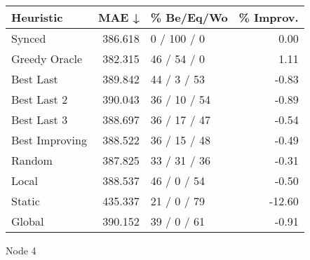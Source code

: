 \begin{tabular}{lrlr}
\toprule
\textbf{Heuristic} & \textbf{MAE ↓} & \textbf{\% Be/Eq/Wo} & \textbf{\% Improv.} \\
\midrule
            Synced &        386.618 &          0 / 100 / 0 &                0.00 \\
     Greedy Oracle &        382.315 &          46 / 54 / 0 &                1.11 \\
         Best Last &        389.842 &          44 / 3 / 53 &               -0.83 \\
       Best Last 2 &        390.043 &         36 / 10 / 54 &               -0.89 \\
       Best Last 3 &        388.697 &         36 / 17 / 47 &               -0.54 \\
    Best Improving &        388.522 &         36 / 15 / 48 &               -0.49 \\
            Random &        387.825 &         33 / 31 / 36 &               -0.31 \\
             Local &        388.537 &          46 / 0 / 54 &               -0.50 \\
            Static &        435.337 &          21 / 0 / 79 &              -12.60 \\
            Global &        390.152 &          39 / 0 / 61 &               -0.91 \\
\bottomrule
\end{tabular}
\caption{Node 4}
\label{tab:non_lr05_le2_bs4_4}
